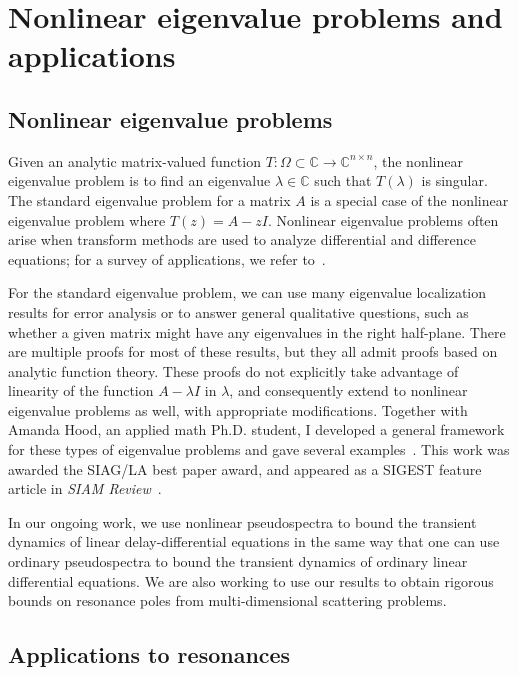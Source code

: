 \documentclass{amsart}
\newcommand{\bbC}{\mathbb{C}}
\begin{document}
\section{Nonlinear eigenvalue problems and applications}
\label{sec-nep}

\subsection*{Nonlinear eigenvalue problems}
Given an analytic matrix-valued function
$T : \Omega \subset \bbC \rightarrow \bbC^{n \times n}$,
the nonlinear eigenvalue problem is to find an eigenvalue
$\lambda \in \bbC$ such that $T(\lambda)$ is singular.
The standard eigenvalue problem for a matrix $A$
is a special case of the nonlinear eigenvalue problem where
$T(z) = A-zI$.  Nonlinear eigenvalue problems often arise
when transform methods are used to analyze differential and
difference equations; for a survey of applications, we refer to~\cite{2015-sirev}.

For the standard eigenvalue problem, we can use
many eigenvalue localization results for error
analysis or to answer general qualitative questions, such as whether a
given matrix might have any eigenvalues in the right half-plane.  There
are multiple proofs for most of these results, but they all admit proofs
based on analytic function theory.  These proofs do not explicitly take
advantage of linearity of the function $A-\lambda I$ in $\lambda$, and
consequently extend to nonlinear eigenvalue problems as well, with
appropriate modifications.  Together with Amanda Hood, an applied math
Ph.D. student, I developed a general framework for these types of
eigenvalue problems and gave several examples~\cite{2013-simax}.  This
work was awarded the SIAG/LA best paper award, and appeared as a SIGEST
feature article in {\em SIAM Review}~\cite{2015-sirev}.

In our ongoing work, we use nonlinear pseudospectra to bound the
transient dynamics of linear delay-differential equations in the same
way that one can use ordinary pseudospectra to bound the transient
dynamics of ordinary linear differential equations.  We are also working
to use our results to obtain rigorous bounds on resonance poles from
multi-dimensional scattering problems.

\subsection*{Applications to resonances}
\end{document}
